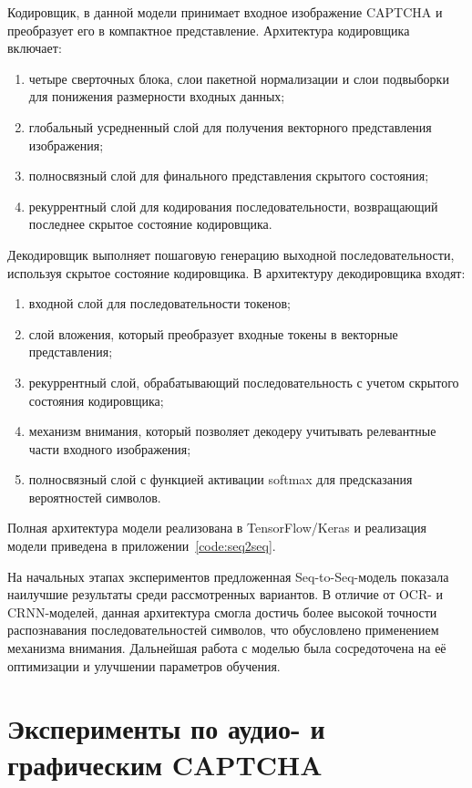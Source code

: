 Кодировщик, в данной модели принимает входное изображение CAPTCHA и преобразует 
его в компактное представление. Архитектура кодировщика включает:
\begin{enumerate}
    \item четыре сверточных блока, слои пакетной нормализации и слои подвыборки 
    для понижения размерности входных данных;
    \item глобальный усредненный слой для получения векторного представления 
    изображения;
    \item полносвязный слой для финального представления скрытого состояния;
    \item рекуррентный слой для кодирования последовательности, возвращающий 
    последнее скрытое состояние кодировщика.
\end{enumerate}

Декодировщик выполняет пошаговую генерацию выходной последовательности, используя 
скрытое состояние кодировщика. В архитектуру декодировщика входят:
\begin{enumerate}
    \item входной слой для последовательности токенов;
    \item слой вложения, который преобразует входные токены в векторные 
    представления;
    \item рекуррентный слой, обрабатывающий последовательность с учетом скрытого 
    состояния кодировщика;
    \item механизм внимания, который позволяет декодеру учитывать релевантные 
    части входного изображения;
    \item полносвязный слой с функцией активации softmax для предсказания 
    вероятностей символов.
\end{enumerate}

Полная архитектура модели реализована в TensorFlow/Keras и реализация модели 
приведена в приложении~\ref{code:seq2seq}.

На начальных этапах экспериментов предложенная Seq-to-Seq-модель показала 
наилучшие результаты среди рассмотренных вариантов. В отличие от OCR- и 
CRNN-моделей, данная архитектура смогла достичь более высокой точности 
распознавания последовательностей символов, что обусловлено применением 
механизма внимания. Дальнейшая работа с моделью была сосредоточена на её 
оптимизации и улучшении параметров обучения.

\section{Эксперименты по аудио- и графическим CAPTCHA}

